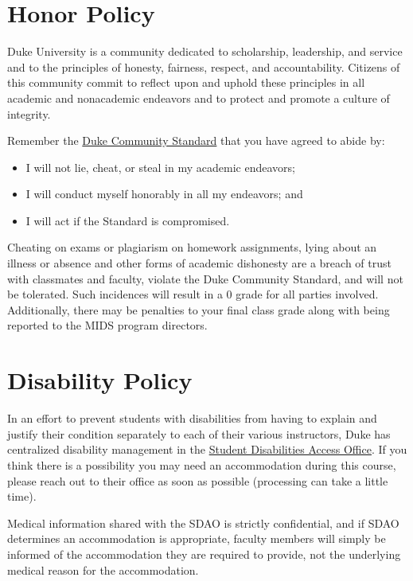 \documentclass[12pt]{article}
\begin{document}
\section{Honor Policy}

Duke University is a community dedicated to scholarship, leadership, and service and to the principles of honesty, fairness, respect, and accountability. Citizens of this community commit to reflect upon and uphold these principles in all academic and nonacademic endeavors and to protect and promote a culture of integrity.

Remember the \href{https://studentaffairs.duke.edu/conduct/about-us/duke-community-standard}{Duke Community Standard} that you have agreed to abide by:

\begin{itemize}
	\item I will not lie, cheat, or steal in my academic endeavors;
	\item I will conduct myself honorably in all my endeavors; and
	\item I will act if the Standard is compromised.
\end{itemize}

Cheating on exams or plagiarism on homework assignments, lying about an illness or absence and other forms of academic dishonesty are a breach of trust with classmates and faculty, violate the Duke Community Standard, and will not be tolerated. Such incidences will result in a 0 grade for all parties involved. Additionally, there may be penalties to your final class grade along with being reported to the MIDS program directors.

\section{Disability Policy}

In an effort to prevent students with disabilities from having to explain and justify their condition separately to each of their various instructors, Duke has centralized disability management in the \href{https://access.duke.edu/students}{Student Disabilities Access Office}. If you think there is a possibility you may need an accommodation during this course, please reach out to their office as soon as possible (processing can take a little time).

Medical information shared with the SDAO is strictly confidential, and if SDAO determines an accommodation is appropriate, faculty members will simply be informed of the accommodation they are required to provide, not the underlying medical reason for the accommodation.
\end{document}
